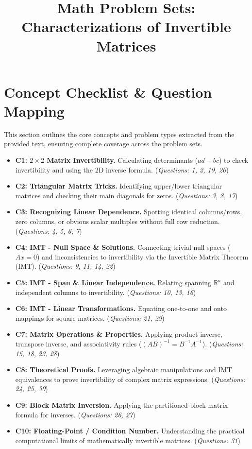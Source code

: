 \documentclass[12pt]{article}
\title{Math Problem Sets: Characterizations of Invertible Matrices}
\author{}
\date{}
\begin{document}
\maketitle

\tableofcontents
\newpage

\section{Concept Checklist \& Question Mapping}
\label{sec:checklist_start}
This section outlines the core concepts and problem types extracted from the provided text, ensuring complete coverage across the problem sets.

\begin{itemize}
    \item \textbf{C1: $2 \times 2$ Matrix Invertibility.} Calculating determinants ($ad-bc$) to check invertibility and using the 2D inverse formula. (\textit{Questions: 1, 2, 19, 20})
    \item \textbf{C2: Triangular Matrix Tricks.} Identifying upper/lower triangular matrices and checking their main diagonals for zeros. (\textit{Questions: 3, 8, 17})
    \item \textbf{C3: Recognizing Linear Dependence.} Spotting identical columns/rows, zero columns, or obvious scalar multiples without full row reduction. (\textit{Questions: 4, 5, 6, 7})
    \item \textbf{C4: IMT - Null Space \& Solutions.} Connecting trivial null spaces ($Ax=0$) and inconsistencies to invertibility via the Invertible Matrix Theorem (IMT). (\textit{Questions: 9, 11, 14, 22})
    \item \textbf{C5: IMT - Span \& Linear Independence.} Relating spanning $\mathbb{R}^n$ and independent columns to invertibility. (\textit{Questions: 10, 13, 16})
    \item \textbf{C6: IMT - Linear Transformations.} Equating one-to-one and onto mappings for square matrices. (\textit{Questions: 21, 29})
    \item \textbf{C7: Matrix Operations \& Properties.} Applying product inverse, transpose inverse, and associativity rules ($(AB)^{-1} = B^{-1}A^{-1}$). (\textit{Questions: 15, 18, 23, 28})
    \item \textbf{C8: Theoretical Proofs.} Leveraging algebraic manipulations and IMT equivalences to prove invertibility of complex matrix expressions. (\textit{Questions: 24, 25, 30})
    \item \textbf{C9: Block Matrix Inversion.} Applying the partitioned block matrix formula for inverses. (\textit{Questions: 26, 27})
    \item \textbf{C10: Floating-Point / Condition Number.} Understanding the practical computational limits of mathematically invertible matrices. (\textit{Questions: 31})
\end{itemize}
\end{document}
